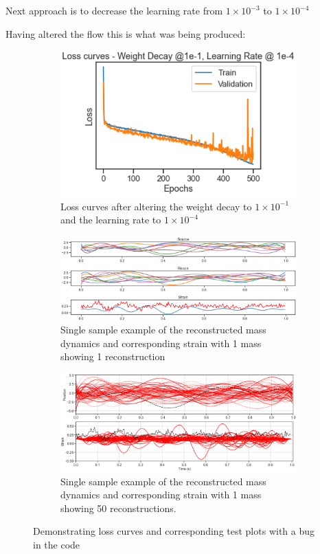 \documentclass[a4paper, 12pt]{article}
\begin{document}
Next approach is to decrease the learning rate from $1 \times 10^{-3}$ to $1 \times 10^{-4}$

Having altered the flow this is what was being produced:

\begin{figure}[H]
\begin{subfigure}{.5\textwidth}
    \centering
    \includegraphics[width=1\textwidth, scale = 0.5]{loss0.PNG}
    \caption{Loss curves after altering the weight decay to $1 \times 10^{-1}$ and the learning rate to $1 \times 10^{-4}$}
    \label{fig:lc1}
\end{subfigure} \hfill
\begin{subfigure}{.4\textwidth}
    \centering
    \includegraphics[width=1.1\textwidth, scale = 0.5]{recon1.PNG}
    \caption{Single sample example of the reconstructed mass dynamics and corresponding strain with 1 mass showing 1 reconstruction}
    \label{fig:massrec1}
\end{subfigure} \hfill
\begin{subfigure}{.4\textwidth}
    \centering
    \includegraphics[width=1.1\textwidth, scale = 0.5]{recon50.PNG}
    \caption{Single sample example of the reconstructed mass dynamics and corresponding strain with 1 mass showing 50 reconstructions.}
    \label{fig:massrec01}
\end{subfigure}%
\centering
\caption{Demonstrating loss curves and corresponding test plots with a bug in the code}


\end{figure}
\end{document}
